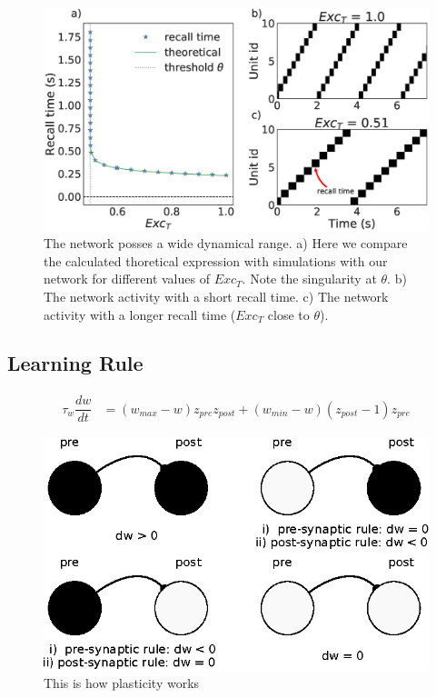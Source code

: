 \documentclass{esannV2}
\begin{document}
\begin{figure}[h!]
\centering
\includegraphics[scale=0.25]{dynamical_range.eps}
\caption{The network posses a wide dynamical range. a) Here we compare the calculated thoretical expression with simulations with our network for different values of $Exc_T$. Note the singularity at $\theta$. b) The network activity with a short recall time. c) The network activity with a longer recall time ($Exc_T$ close to $\theta$).}\label{Fig:dynamical_range}
\end{figure}



\subsection{Learning Rule}

\begin{align}
\tau_w \dfrac{dw}{dt} &= (w_{max} - w) z_{pre}z_{post} + (w_{min} - w) (z_{post} - 1)z_{pre} 
\end{align}

\begin{figure}[h!]
\centering
\includegraphics[scale=1.3]{plasticity_diagram.eps}
\caption{This is how plasticity works}\label{Fig:plasticity diagram}
\end{figure}
\end{document}
